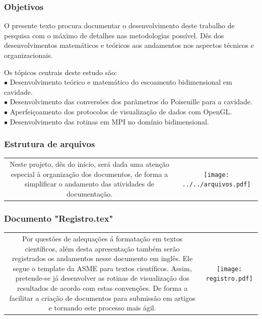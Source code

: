 \documentclass[xcolor=dvipsnames,10pt,aspectratio=169]{beamer}
\begin{document}
	\begin{frame}
		\frametitle{Objetivos}

		\centering
		O presente texto procura documentar o desenvolvimento deste trabalho de pesquisa com o máximo de detalhes nas metodologias possível. Dês dos desenvolvimentos matemáticos e teóricos aos andamentos nos aspectos técnicos e organizacionais.

		\vspace{0.5cm}

		\flushleft
		Os tópicos centrais deste estudo são:\\
		\quad $\bullet$ Desenvolvimento teórico e matemático do escoamento bidimensional em cavidade.\\
		\quad $\bullet$ Desenvolvimento das conversões dos parâmetros do Poiseuille para a cavidade.\\
		\quad $\bullet$ Aperfeiçoamento dos protocolos de visualização de dados com OpenGL.\\
		\quad $\bullet$ Desenvolvimento das rotinas em MPI no domínio bidimensional.\\

	\end{frame}





	\begin{frame}
		\frametitle{Estrutura de arquivos}
		\begin{tabular}{c c}
			{
				\begin{minipage}[h!]{0.15\textwidth}
					\centering
					\small
					Neste projeto, dês do início, será dada uma atenção especial à organização dos documentos, de forma a simplificar o andamento das atividades de documentação.
					\vspace{6cm}
				\end{minipage}
			}&{
				\texttt{[image: ../../arquivos.pdf]}
			}
		\end{tabular}

	\end{frame}





	\begin{frame}
		\frametitle{Documento "Registro.tex"}
		\begin{tabular}{c c}
			{
				\begin{minipage}[h!]{0.4\textwidth}
					\centering
					\small
					Por questões de adequações á formatação em textos científicos, além desta apresentação também serão registrados os andamentos nesse documento em inglês. Ele segue o template da ASME para textos científicos. Assim, pretende-se já desenvolver as rotinas de visualização dos resultados de acordo com estas convenções. De forma a facilitar a criação de documentos para submissão em artigos e tornando este processo mais ágil.
					\vspace{6cm}
				\end{minipage}
			}&{
				\texttt{[image: registro.pdf]}
			}
		\end{tabular}

	\end{frame}
\end{document}
